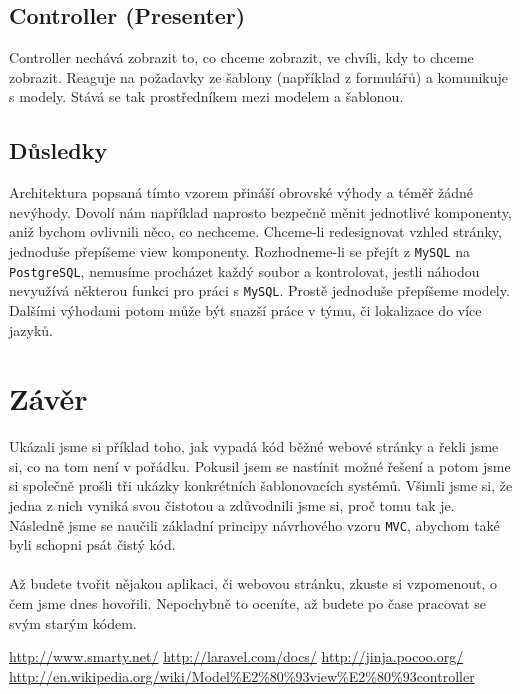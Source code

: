 \documentclass[10pt,a4paper]{article}
\begin{document}
		\subsection{Controller (Presenter)}
			Controller nechává zobrazit to, co chceme zobrazit, ve chvíli, kdy to chceme zobrazit. Reaguje na požadavky ze šablony (například z formulářů) a komunikuje s modely. Stává se tak prostředníkem mezi modelem a šablonou.

		\subsection{Důsledky}
			Architektura popsaná tímto vzorem přináší obrovské výhody a téměř žádné nevýhody. Dovolí nám například naprosto bezpečně měnit jednotlivé komponenty, aniž bychom ovlivnili něco, co nechceme. Chceme-li redesignovat vzhled stránky, jednoduše přepíšeme view komponenty. Rozhodneme-li se přejít z \texttt{MySQL} na \texttt{PostgreSQL}, nemusíme procházet každý soubor a kontrolovat, jestli náhodou nevyužívá některou funkci pro práci s \texttt{MySQL}. Prostě jednoduše přepíšeme modely. Dalšími výhodami potom může být snazší práce v týmu, či lokalizace do více jazyků.

	\newpage
	\section{Závěr}
	Ukázali jsme si příklad toho, jak vypadá kód běžné webové stránky a řekli jsme si, co na tom není v pořádku. Pokusil jsem se nastínit možné řešení a potom jsme si společně prošli tři ukázky konkrétních šablonovacích systémů. Všimli jsme si, že jedna z nich vyniká svou čistotou a zdůvodnili jsme si, proč tomu tak je. Následně jsme se naučili základní principy návrhového vzoru \texttt{MVC}, abychom také byli schopni psát čistý kód.
	\\
	\\
	Až budete tvořit nějakou aplikaci, či webovou stránku, zkuste si vzpomenout, o čem jsme dnes hovořili. Nepochybně to oceníte, až budete po čase pracovat se svým starým kódem.


	\begin{thebibliography}{}
		 \url{http://www.smarty.net/}
		 \url{http://laravel.com/docs/}
		 \url{http://jinja.pocoo.org/}
		 \url{http://en.wikipedia.org/wiki/Model%E2%80%93view%E2%80%93controller}
	\end{thebibliography}
\end{document}
